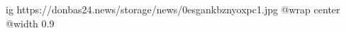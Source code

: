  
 
 
 
 

\ifcmt
  ig https://donbas24.news/storage/news/0esgankbznyoxpc1.jpg
  @wrap center
  @width 0.9
\fi
